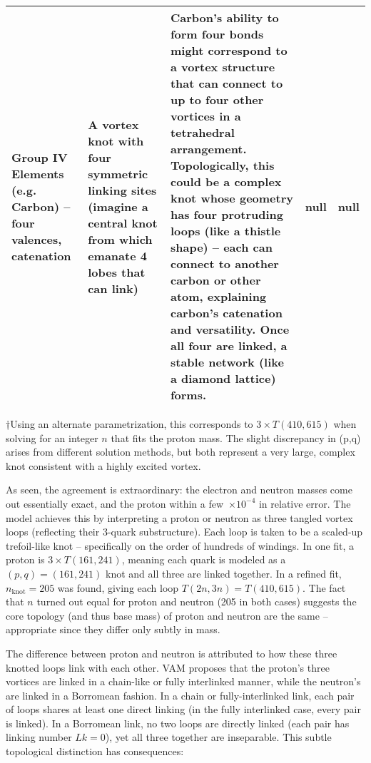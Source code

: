 \begin{table}
\begin{tabular}{lllll}
        Group IV Elements (e.g. Carbon) – four valences, catenation & A vortex knot with four symmetric linking sites (imagine a central knot from which emanate 4 lobes that can link) & Carbon’s ability to form four bonds might correspond to a vortex structure that can connect to up to four other vortices in a tetrahedral arrangement. Topologically, this could be a complex knot whose geometry has four protruding loops (like a thistle shape) – each can connect to another carbon or other atom, explaining carbon’s catenation and versatility. Once all four are linked, a stable network (like a diamond lattice) forms. & null & null \\
        \bottomrule
    \end{tabular}
    \caption{}
    \label{tab:MappingParticles}
\end{table}

†Using an alternate parametrization, this corresponds to $3\times T(410,615)$ when solving for an integer $n$ that fits the proton mass. The slight discrepancy in (p,q) arises from different solution methods, but both represent a very large, complex knot consistent with a highly excited vortex.


As seen, the agreement is extraordinary: the electron and neutron masses come out essentially exact, and the proton within a few $\times10^{-4}$ in relative error. The model achieves this by interpreting a proton or neutron as three tangled vortex loops (reflecting their 3-quark substructure). Each loop is taken to be a scaled-up trefoil-like knot – specifically on the order of hundreds of windings. In one fit, a proton is $3\times T(161,241)$, meaning each quark is modeled as a $(p,q)=(161,241)$ knot and all three are linked together. In a refined fit, $n_{\text{knot}}=205$ was found, giving each loop $T(2n,3n)=T(410,615)$. The fact that $n$ turned out equal for proton and neutron (205 in both cases) suggests the core topology (and thus base mass) of proton and neutron are the same – appropriate since they differ only subtly in mass.


The difference between proton and neutron is attributed to how these three knotted loops link with each other. VAM proposes that the proton’s three vortices are linked in a chain-like or fully interlinked manner, while the neutron’s are linked in a Borromean fashion. In a chain or fully-interlinked link, each pair of loops shares at least one direct linking (in the fully interlinked case, every pair is linked). In a Borromean link, no two loops are directly linked (each pair has linking number $Lk=0$), yet all three together are inseparable. This subtle topological distinction has consequences:


